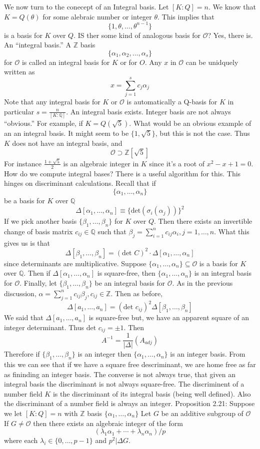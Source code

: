 \documentclass{article}
\begin{document}
We now turn to the conecept of an Integral basis.
Let $[K:Q] = n$. We know that $K=Q(\theta)$ for some alebraic number or integer
$\theta$. This implies that
\[ \{1,\theta,\ldots,\theta^{n-1}\} \]
is a basis for $K$ over $Q$. IS ther some kind of analogous basis for
$\mathcal{O}$? Yes, there is. An ``integral basis.'' A $\mathbb{Z}$ basis 
\[ \{\alpha_1, \alpha_2, \ldots, \alpha_s\} \]
for $\mathcal{O}$ is called an integral basis for $K$ or for $O$. Any $x$ in
$\mathcal{O}$ can be unidquely written as 
\[ x = \sum_{j = 1}^s c_j \alpha_j \]
Note that any integral basis for $K$ or $\mathcal{O}$ is automatically a Q-basis
for $K$ in particular $s = \frac{n}{[K:\mathbb{Q}]}$. An integral basis exists. 
Integer basis are not always ``obvious.'' For example, if $K = Q(\sqrt{5})$.
What would be an obvious example of an an integral basis. It might seem to be
$\{1,\sqrt{5}\}$, but this is not the case. Thus $K$ does not have an integral
basis, and 
\[ \mathcal{O} \supset \mathbb{Z}[\sqrt{5}] \]
For instance $\frac{1+\sqrt{5}}{2}$ is an algebraic integer in $K$ since it's a
root of $x^2 -x +1 = 0$. How do we compute integral bases? There is a useful
algorithm for this. This hinges on discriminant calculations. Recall that if 
\[ \{ \alpha_1, \ldots,\alpha_n \} \]
be a basis for $K$ over $\mathbb{Q}$
\[ \Delta[\alpha_1,\ldots,\alpha_n] \equiv \{ \text{det}(\sigma_i(\alpha_j))
\}^2 \]
If we pick another basis $\{\beta_1, \ldots,\beta_n\}$ for $K$ over $Q$. Then
there exists an invertible change of basis matrix $c_{ij}\in \mathbb{Q}$ such
that $\beta_j = \sum_{i=1}^n c_{ij}\alpha_i, j = 1, \ldots, n$. What this gives
us is that
\[ \Delta[\beta_1,\ldots,\beta_n] = (\text{det } C)^2 \cdot
\Delta[\alpha_1,\ldots,\alpha_n] \]
since determinants are multiplicative. Suppose $\{\alpha_1,\ldots,\alpha_n\}
\subseteq \mathcal{O}$ is a basis for $K$ over $\mathbb{Q}$. Then if
$\Delta[\alpha_1,\ldots,\alpha_n]$ is square-free, then
$\{\alpha_1,\ldots,\alpha_n\}$ is an integral basis for $\mathcal{O}$. Finally,
let $\{\beta_1,\ldots,\beta_n\}$ be an integral basis for $\mathcal{O}$. As in
the previous discussion, $\alpha = \sum_{j = 1}^n c_{ij} \beta_j, c_{ij} \in
\mathbb{Z}$. Then as before, 
\[ \Delta[ a_1,\ldots,a_n] = (\text{det } c_{ij})^2
\Delta[\beta_1,\ldots,\beta_n] \]
We said that $\Delta[ a_1,\ldots,a_n]$ is square-free but, we have an apparent
square of an integer determinant. Thus $\text{det } c_{ij} = \pm 1$. Then
\[ A^{-1} = \frac{1}{|\Delta|} (A_{adj}) \]
Therefore if $\{\beta_1,\ldots,\beta_n\}$ is an integer then $\{\alpha_1,\ldots,\alpha_n\}$ is
an integer basis. From this we can see that if we have a square free
descriminant, we are home free as far as fininding an integer basis. The
converse is not always true, that given an integral basis the discriminant is
not always square-free. The discriminent of a number field $K$ is the
discriminant of its integral basis (being well defined). Also the discriminant
of a number field is always an integer. Proposition 2.21: Suppose we let $[K:Q]
= n$ with $\mathbb{Z}$ basis $\{\alpha_1,\ldots,\alpha_n\}$ Let $G$ be an
additive subgroup of $\mathcal{O}$ If $G\neq \mathcal{O}$ then there exists an
algebraic integer of the form 
\[ (\lambda_1 \alpha_1 + \cdots + \lambda_n \alpha_n)/p \]
where each $\lambda_i \in \{0,\ldots,p-1\}$ and $p^2 | \Delta G$. 
\end{document}
